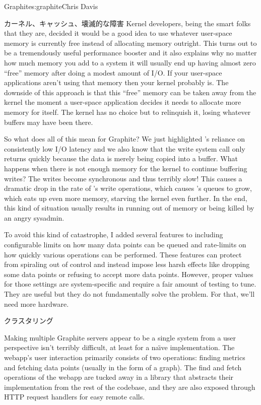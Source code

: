 \begin{aosachapter}{Graphite}{s:graphite}{Chris Davis}
\begin{aosasect1}{カーネル、キャッシュ、壊滅的な障害}
Kernel developers, being the smart folks that they are, decided it
would be a good idea to use whatever user-space memory is currently
free instead of allocating memory outright. This turns out to be a
tremendously useful performance booster and it also explains why no
matter how much memory you add to a system it will usually end up
having almost zero ``free'' memory after doing a modest amount of
I/O\@. If your user-space applications aren't using that memory then
your kernel probably is. The downside of this approach is that this
``free'' memory can be taken away from the kernel the moment a
user-space application decides it needs to allocate more memory for
itself. The kernel has no choice but to relinquish it, losing whatever
buffers may have been there.

So what does all of this mean for Graphite? We just highlighted
's reliance on consistently low I/O latency and we also know
that the write system call only returns quickly because the data is
merely being copied into a buffer. What happens when there is not
enough memory for the kernel to continue buffering writes? The writes
become synchronous and thus terribly slow! This causes a dramatic drop
in the rate of 's write operations, which causes 's queues
to grow, which eats up even more memory, starving the kernel even
further. In the end, this kind of situation usually results in 
running out of memory or being killed by an angry sysadmin.

To avoid this kind of catastrophe, I added several features to 
including configurable limits on how many data points can be queued
and rate-limits on how quickly various  operations can be
performed.  These features can protect  from spiraling out of
control and instead impose less harsh effects like dropping some data
points or refusing to accept more data points. However, proper values
for those settings are system-specific and require a fair amount of
testing to tune. They are useful but they do not fundamentally solve
the problem.  For that, we'll need more hardware.

\end{aosasect1}

\begin{aosasect1}{クラスタリング}

Making multiple Graphite servers appear to be a single system from
a user perspective isn't terribly difficult, at least for a na\"{\i}ve
implementation.  The webapp's user interaction primarily consists of
two operations: finding metrics and fetching data points (usually in
the form of a graph). The find and fetch operations of the webapp are
tucked away in a library that abstracts their implementation from the
rest of the codebase, and they are also exposed through HTTP request
handlers for easy remote calls.


\end{aosasect1}
\end{aosachapter}
